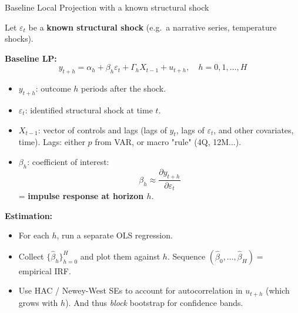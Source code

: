 \documentclass{beamer}
\begin{document}
\begin{frame}{Baseline Local Projection with a known structural shock}
\footnotesize

 Let $\varepsilon_t$ be a \textbf{known structural shock} (e.g.\ a narrative series, temperature shocks).

\medskip
\textbf{Baseline LP:}
\[
y_{t+h} = \alpha_h + \beta_h \varepsilon_t + \Gamma_h X_{t-1} + u_{t+h},
\quad h = 0,1,\dots,H
\]

\begin{itemize}
  \item $y_{t+h}$: outcome $h$ periods after the shock.
  \item $\varepsilon_t$: identified structural shock at time $t$.
  \item $X_{t-1}$: vector of controls and lags (lags of $y_t$, lags of $\varepsilon_t$, and other covariates,
        time). Lags: either $p$ from VAR, or macro "rule" (4Q, 12M...).
  \item $\beta_h$: coefficient of interest:
        \[
          \beta_h \approx \frac{\partial y_{t+h}}{\partial \varepsilon_t}
        \]
        = \textbf{impulse response at horizon $h$}.
\end{itemize}

\textbf{Estimation:}
\begin{itemize}
  \item For each $h$, run a separate OLS regression.
  \item Collect $\{\hat{\beta}_h\}_{h=0}^H$ and plot them against $h$. Sequence $(\hat{\beta}_0,\dots,\hat{\beta}_H) =$ empirical IRF.
  \item Use HAC / Newey-West SEs to account for autocorrelation in $u_{t+h}$
        (which grows with $h$). And thus \textit{block }bootstrap for confidence bands.
        \end{itemize}
\end{frame}
\end{document}
